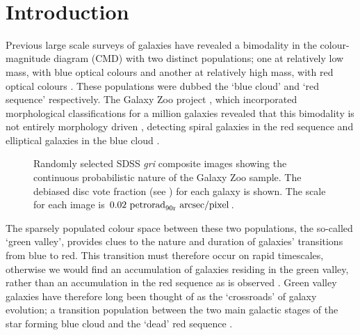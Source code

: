 \documentclass[useAMS,usenatbib]{mn2e}
\def\changed    {\color{titlecol} }
\begin{document}
\\

\section{Introduction}
Previous large scale surveys of galaxies have revealed a bimodality in the colour-magnitude diagram (CMD) with two distinct populations; one at relatively low mass, with blue optical colours and another at relatively high mass, with red optical colours \citep{Baldry04, Baldry06, Willmer06, BLB08, Brammer09}. These populations were dubbed the `blue cloud' and `red sequence' respectively. The Galaxy Zoo project \citep{Lintott11}, which incorporated morphological classifications for a million galaxies revealed that this bimodality is not entirely morphology driven \citep{Strat01, Bamford09, Skibba09}, detecting spiral galaxies in the red sequence \citep{Masters10} and elliptical galaxies in the blue cloud \citep{Sch09}.  

\begin{figure}
\caption{{\changed Randomly selected SDSS \emph{gri} composite images showing the continuous probabilistic nature of the Galaxy Zoo sample. The debiased disc vote fraction (see \citealt{GZ2}) for each galaxy is shown. The scale for each image is $0.02 ~\rm{petrorad}_{90r}~arcsec/pixel$.}}
\label{mosaic}
\end{figure}

The sparsely populated colour space between these two populations, the so-called `green valley', provides clues to the nature and duration of galaxies' transitions from blue to red. This transition must therefore occur on rapid timescales, otherwise we would find an accumulation of galaxies residing in the green valley, rather than an accumulation in the red sequence as is observed \citep{Arnouts07, Martin07}. Green valley galaxies have therefore long been thought of as the `crossroads' of galaxy evolution; a transition population between the two main galactic stages of the star forming blue cloud and the `dead' red sequence \citep{Bell04, Wyder07, Schim07, Martin07, Faber07, Mendez11, Gonc12, Sch2014}. 
\end{document}
